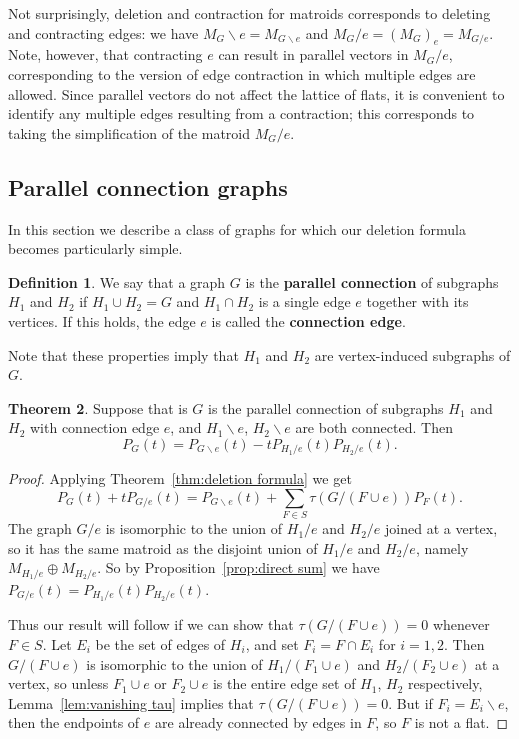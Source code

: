 \documentclass[12pt,reqno]{amsart}
\theoremstyle{definition}
\newtheorem{theorem}{Theorem}[section]
\newtheorem{definition}[theorem]{Definition}
\theoremstyle{remark}
\newcommand{\ssm}{\smallsetminus}
\renewcommand{\(}{\left(}
\renewcommand{\)}{\right)}
\newcommand{\<}{\left<}
\renewcommand{\>}{\right>}
\begin{document}
Not surprisingly, deletion and contraction for matroids corresponds to deleting and contracting edges: we have $M_G \ssm e = M_{G \ssm e}$ and $M_G/e = (M_G)_e = M_{G/e}$.  Note, however, that contracting $e$ can result in parallel vectors in $M_G/e$, corresponding to the version of edge contraction in which multiple edges are allowed.  Since parallel vectors do not affect the lattice of flats, it is convenient to identify any multiple edges resulting from a contraction; this corresponds to taking the simplification of the matroid $M_G/e$.

\subsection{Parallel connection graphs}

In this section we describe a class of graphs for which our deletion formula becomes particularly simple.

\begin{definition}
We say that a graph $G$ is the \textbf{parallel connection} of subgraphs $H_1$ and $H_2$ if 
$H_1 \cup H_2 = G$ and $H_1 \cap H_2$ is a 
single edge $e$ together with its vertices.
If this holds, the edge $e$ is called the \textbf{connection edge}. 
\end{definition}
Note that these properties imply that $H_1$ and $H_2$ are vertex-induced subgraphs of $G$.



\begin{theorem}\label{thm:edge-gluing formula}
Suppose that is $G$ is the parallel connection of subgraphs $H_1$ and $H_2$ with connection edge $e$, and 
$H_1\ssm e$, $H_2 \ssm e$ are both connected.
Then
\[P_G(t) = P_{G\ssm e}(t) - tP_{H_1/e}(t)P_{H_2/e}(t).\]
\end{theorem}

\begin{proof}
Applying Theorem~\ref{thm:deletion formula} we get
\[P_G(t) + tP_{G/e}(t) = P_{G\ssm e}(t) + \sum_{F\in S} \tau({G/(F\cup e)})P_F(t).\]
The graph $G/e$ is isomorphic to the union of $H_1/e$ and $H_2/e$ joined at a vertex, so it has the same matroid as the disjoint union of $H_1/e$ and $H_2/e$, namely $M_{H_1/e}\oplus M_{H_2/e}$. 
So by Proposition~\ref{prop:direct sum} we have
$P_{G/e}(t) = P_{H_1/e}(t)P_{H_2/e}(t)$.

Thus our result will follow if we can show that
$\tau({G/(F\cup e)}) = 0$ whenever $F \in S$.  
Let $E_i$ be the set of edges of $H_i$, and set
$F_i = F \cap E_i$ for $i = 1,2$.  Then
$G/(F\cup e)$ is isomorphic to the union of $H_1/(F_1\cup e)$ and $H_2/(F_2\cup e)$
at a vertex, so unless $F_1 \cup e$ or $F_2 \cup e$ is the entire edge set of $H_1$, $H_2$ respectively, Lemma~\ref{lem:vanishing tau} implies that $\tau({G/(F\cup e)}) = 0$.  But if 
$F_i = E_i \ssm e$, then the endpoints of $e$ are already connected by edges in $F$, so $F$ is not a flat.
\end{proof}
\end{document}
